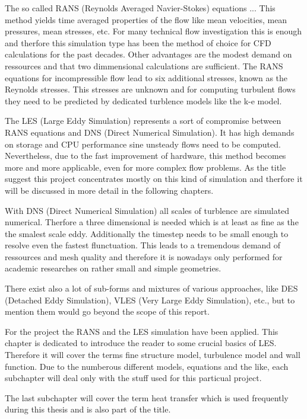 The so called RANS (Reynolds Averaged Navier-Stokes) equations ...
This method yields time averaged properties of the flow like mean velocities, mean pressures, mean stresses, etc. For many technical flow investigation this is enough and therfore this simulation type has been the method of choice for CFD calculations for the past decades. Other advantages are the modest demand on ressources and that two dimmensional calculations are sufficient.
The RANS equations for incompressible flow lead to six additional stresses, known as the Reynolds stresses. This stresses are unknown and for computing turbulent flows they need to be predicted by dedicated turblence models like the k-e model.

The LES (Large Eddy Simulation) represents a sort of compromise between RANS equations and DNS (Direct Numerical Simulation). It has high demands on storage and CPU performance sine unsteady flows need to be computed. Nevertheless, due to the fast improvement of hardware, this method becomes more and more applicable, even for more complex flow problems. As the title suggest this project concentrates mostly on this kind of simulation and therfore it will be discussed in more detail in the following chapters.

With DNS (Direct Numerical Simulation) all scales of turblence are simulated numerical. Therfore a three dimensional is needed which is at least as fine as the the smalest scale eddy. Additionally the timestep needs to be small enough to resolve even the fastest flunctuation. This leads to a tremendous demand of ressources and mesh quality and therefore it is nowadays only performed for academic researches on rather small and simple geometries.

There exist also a lot of sub-forms and mixtures of various approaches, like DES (Detached Eddy Simulation), VLES (Very Large Eddy Simulation), etc., but to mention them would go beyond the scope of this report.

For the project the RANS and the LES simulation have been applied. This chapter is dedicated to introduce the reader to some crucial basics of LES. Therefore it will cover the terms fine structure model, turbulence model and wall function. Due to the numberous different models, equations and the like, each subchapter will deal only with the stuff used for this particual project.

The last subchapter will cover the term heat transfer which is used frequently during this thesis and is also part of the title.
